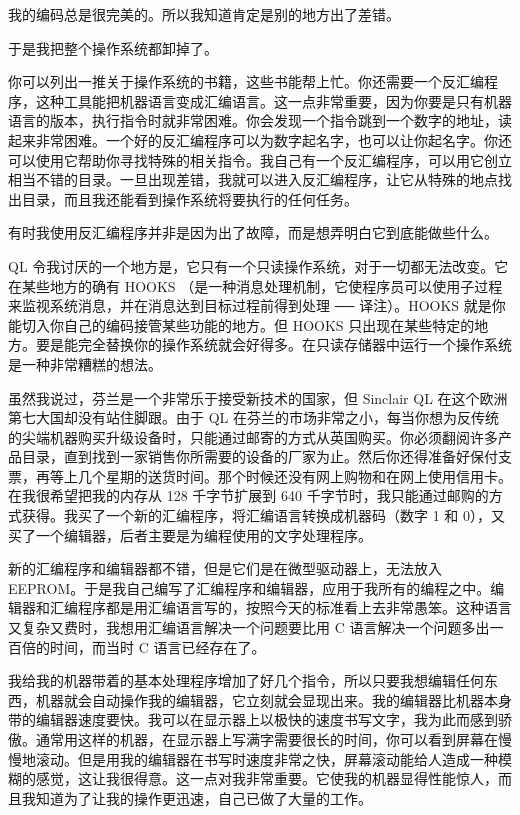 我的编码总是很完美的。所以我知道肯定是别的地方出了差错。

于是我把整个操作系统都卸掉了。

你可以列出一推关于操作系统的书籍，这些书能帮上忙。你还需要一个反汇编程序，这种工具能把机器语言变成汇编语言。这一点非常重要，因为你要是只有机器语言的版本，执行指令时就非常困难。你会发现一个指令跳到一个数字的地址，读起来非常困难。一个好的反汇编程序可以为数字起名字，也可以让你起名字。你还可以使用它帮助你寻找特殊的相关指令。我自己有一个反汇编程序，可以用它创立相当不错的目录。一旦出现差错，我就可以进入反汇编程序，让它从特殊的地点找出目录，而且我还能看到操作系统将要执行的任何任务。

有时我使用反汇编程序并非是因为出了故障，而是想弄明白它到底能做些什么。

QL 令我讨厌的一个地方是，它只有一个只读操作系统，对于一切都无法改变。它在某些地方的确有 HOOKS （是一种消息处理机制，它使程序员可以使用子过程来监视系统消息，并在消息达到目标过程前得到处理 ── 译注）。HOOKS 就是你能切入你自己的编码接管某些功能的地方。但 HOOKS 只出现在某些特定的地方。要是能完全替换你的操作系统就会好得多。在只读存储器中运行一个操作系统是一种非常糟糕的想法。

虽然我说过，芬兰是一个非常乐于接受新技术的国家，但 Sinclair QL 在这个欧洲第七大国却没有站住脚跟。由于 QL 在芬兰的市场非常之小，每当你想为反传统的尖端机器购买升级设备时，只能通过邮寄的方式从英国购买。你必须翻阅许多产品目录，直到找到一家销售你所需要的设备的厂家为止。然后你还得准备好保付支票，再等上几个星期的送货时间。那个时候还没有网上购物和在网上使用信用卡。在我很希望把我的内存从 128 千字节扩展到 640 千字节时，我只能通过邮购的方式获得。我买了一个新的汇编程序，将汇编语言转换成机器码（数字 1 和 0），又买了一个编辑器，后者主要是为编程使用的文字处理程序。

新的汇编程序和编辑器都不错，但是它们是在微型驱动器上，无法放入 EEPROM。于是我自己编写了汇编程序和编辑器，应用于我所有的编程之中。编辑器和汇编程序都是用汇编语言写的，按照今天的标准看上去非常愚笨。这种语言又复杂又费时，我想用汇编语言解决一个问题要比用 C 语言解决一个问题多出一百倍的时间，而当时 C 语言已经存在了。

我给我的机器带着的基本处理程序增加了好几个指令，所以只要我想编辑任何东西，机器就会自动操作我的编辑器，它立刻就会显现出来。我的编辑器比机器本身带的编辑器速度要快。我可以在显示器上以极快的速度书写文字，我为此而感到骄傲。通常用这样的机器，在显示器上写满字需要很长的时间，你可以看到屏幕在慢慢地滚动。但是用我的编辑器在书写时速度非常之快，屏幕滚动能给人造成一种模糊的感觉，这让我很得意。这一点对我非常重要。它使我的机器显得性能惊人，而且我知道为了让我的操作更迅速，自己已做了大量的工作。

